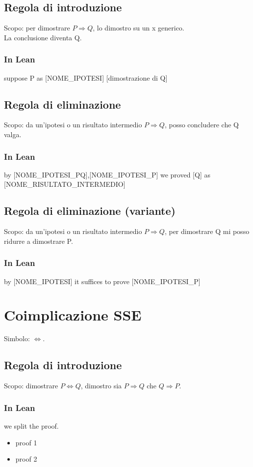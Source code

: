 \documentclass[12pt]{article}
\begin{document}
\subsection{Regola di introduzione}
Scopo: per dimostrare $P \Rightarrow Q$, lo dimostro su un x generico.\\
La conclusione diventa Q.
\subsubsection{In Lean}
\begin{center}
    suppose P as [NOME\_IPOTESI] [dimostrazione di Q]
\end{center}
\subsection{Regola di eliminazione}
Scopo: da un'ipotesi o un risultato intermedio $P \Rightarrow Q$, posso concludere che Q valga.
\subsubsection{In Lean}
\begin{center}
    by [NOME\_IPOTESI\_PQ],[NOME\_IPOTESI\_P] we proved [Q] as [NOME\_RISULTATO\_INTERMEDIO]
\end{center}
\subsection{Regola di eliminazione (variante)}
Scopo: da un'ipotesi o un risultato intermedio $P \Rightarrow Q$, per dimostrare Q mi posso ridurre a dimostrare P.
\subsubsection{In Lean}
\begin{center}
    by [NOME\_IPOTESI] it suffices to prove [NOME\_IPOTESI\_P]
\end{center}
\pagebreak
\section{Coimplicazione SSE}
Simbolo: $\Leftrightarrow$.
\subsection{Regola di introduzione}
Scopo: dimostrare $P \Leftrightarrow Q$, dimostro sia $P \Rightarrow Q$ che $Q \Rightarrow P$.
\subsubsection{In Lean}
\begin{center}
    we split the proof.\\
    \begin{itemize}
        \centering
        \item proof 1
        \item proof 2
    \end{itemize}
\end{center}
\end{document}

